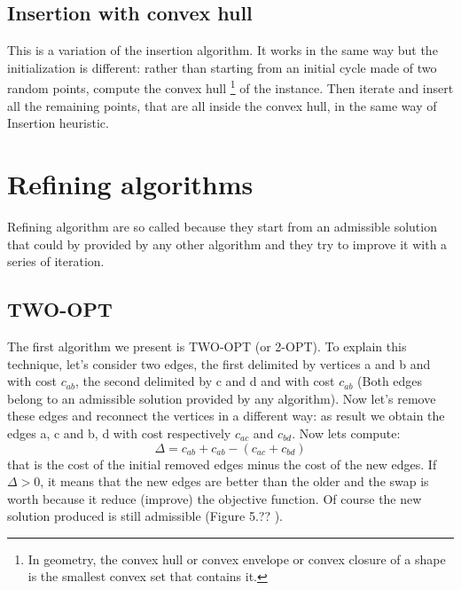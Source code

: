 \subsection{Insertion with convex hull}
This is a variation of the insertion algorithm. It works in the same way but the initialization is different: rather than starting from an initial cycle made of two random points, compute the convex hull \footnote{In geometry, the convex hull or convex envelope or convex closure of a shape is the smallest convex set that contains it. %
} of the instance. Then iterate and insert all the remaining points, that are all inside the convex hull, in the same way of Insertion heuristic.

\section{Refining algorithms}
Refining algorithm are so called because they start from an admissible solution that could by provided by any other algorithm and they try to improve it with a series of iteration.

\subsection{TWO-OPT}
The first algorithm we present is TWO-OPT (or 2-OPT). To explain this technique, let's consider two edges, the first delimited by vertices a and b and with cost $c_{ab}$, the second delimited by c and d and with cost $c_{ab}$ (Both edges belong to an admissible solution provided by any algorithm). Now let's remove these edges and reconnect the vertices in a different way: as result we obtain the edges a, c and b, d with cost respectively $c_{ac}$ and $c_{bd}$. Now lets compute: 
\begin{equation*}
\Delta = c_{ab} + c_{ab} - (c_{ac} + c_{bd})
\end{equation*}
that is the cost of the initial removed edges minus the cost of the new edges. If $\Delta > 0$, it means that the new edges are better than the older and the swap is worth because it reduce (improve) the objective function. Of course the new solution produced is still admissible (Figure 5.?? %
).\\


